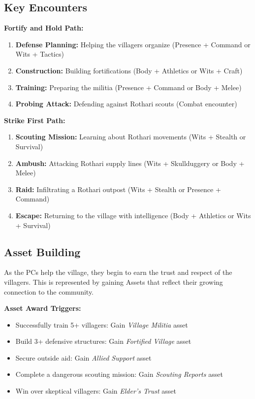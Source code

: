\documentclass[11pt]{article}
\begin{document}
\subsection{Key Encounters}

\textbf{Fortify and Hold Path:}
\begin{enumerate}
\item \textbf{Defense Planning:} Helping the villagers organize (Presence + Command or Wits + Tactics)
\item \textbf{Construction:} Building fortifications (Body + Athletics or Wits + Craft)
\item \textbf{Training:} Preparing the militia (Presence + Command or Body + Melee)
\item \textbf{Probing Attack:} Defending against Rothari scouts (Combat encounter)
\end{enumerate}

\textbf{Strike First Path:}
\begin{enumerate}
\item \textbf{Scouting Mission:} Learning about Rothari movements (Wits + Stealth or Survival)
\item \textbf{Ambush:} Attacking Rothari supply lines (Wits + Skullduggery or Body + Melee)
\item \textbf{Raid:} Infiltrating a Rothari outpost (Wits + Stealth or Presence + Command)
\item \textbf{Escape:} Returning to the village with intelligence (Body + Athletics or Wits + Survival)
\end{enumerate}

\subsection{Asset Building}

As the PCs help the village, they begin to earn the trust and respect of the villagers. This is represented by gaining Assets that reflect their growing connection to the community.

\textbf{Asset Award Triggers:}
\begin{itemize}
\item Successfully train 5+ villagers: Gain \textit{Village Militia} asset
\item Build 3+ defensive structures: Gain \textit{Fortified Village} asset  
\item Secure outside aid: Gain \textit{Allied Support} asset
\item Complete a dangerous scouting mission: Gain \textit{Scouting Reports} asset
\item Win over skeptical villagers: Gain \textit{Elder's Trust} asset
\end{itemize}
\end{document}
